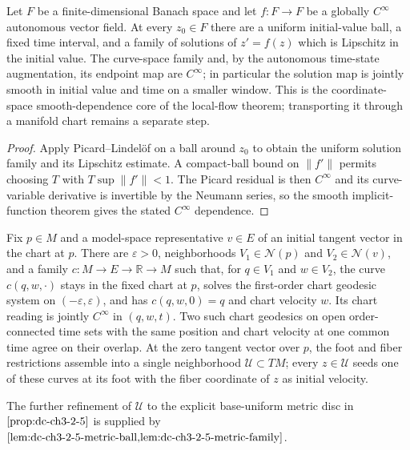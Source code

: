 \begin{lemma}
  \label{lem:dc-ch3-2-2-cinfty}
  \leanok
  Let $F$ be a finite-dimensional Banach space and let $f:F\to F$ be a globally
  $C^\infty$ autonomous vector field.  At every $z_0\in F$ there are a uniform
  initial-value ball, a fixed time interval, and a family of solutions of
  $z'=f(z)$ which is Lipschitz in the initial value.  The curve-space family and,
  by the autonomous time-state augmentation, its endpoint map are $C^\infty$;
  in particular the solution map is jointly smooth in initial value and time on
  a smaller window.  This is the coordinate-space smooth-dependence core of the
  local-flow theorem; transporting it through a manifold chart remains a
  separate step.
\end{lemma}
\begin{proof}
  \leanok
  Apply Picard--Lindelöf on a ball around $z_0$ to obtain the uniform solution
  family and its Lipschitz estimate.  A compact-ball bound on $\|f'\|$ permits
  choosing $T$ with $T\sup\|f'\|<1$.  The Picard residual is then $C^\infty$ and
  its curve-variable derivative is invertible by the Neumann series, so the
  smooth implicit-function theorem gives the stated $C^\infty$ dependence.
\end{proof}

\begin{lemma}
  \label{lem:dc-ch3-2-5-chart-family}
  \leanok
  Fix $p\in M$ and a model-space representative $v\in E$ of an initial
  tangent vector in the chart at $p$.  There are $\varepsilon>0$, neighborhoods
  $V_1\in\mathcal N(p)$ and $V_2\in\mathcal N(v)$, and a family
  $c:M\to E\to\mathbb R\to M$ such that, for $q\in V_1$ and $w\in V_2$,
  the curve $c(q,w,\cdot)$ stays in the fixed chart at $p$, solves the
  first-order chart geodesic system on $(-\varepsilon,\varepsilon)$, and has
  $c(q,w,0)=q$ and chart velocity $w$.  Its chart reading is jointly
  $C^\infty$ in $(q,w,t)$.  Two such chart geodesics on open
  order-connected time sets with the same position and chart velocity at one
  common time agree on their overlap.  At the zero tangent vector over $p$,
  the foot and fiber restrictions assemble into a single neighborhood
  $\mathcal U\subset TM$; every $z\in\mathcal U$ seeds one of these curves at
  its foot with the fiber coordinate of $z$ as initial velocity.

  The further refinement of $\mathcal U$ to the explicit base-uniform metric
  disc in $\cref{prop:dc-ch3-2-5}$ is supplied by
  $\cref{lem:dc-ch3-2-5-metric-ball,lem:dc-ch3-2-5-metric-family}$.
\end{lemma}

